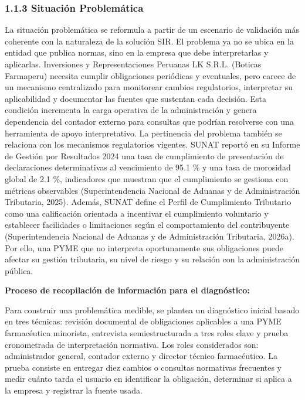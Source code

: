 \documentclass[12pt,a4paper,oneside]{report}
\begin{document}
\subsubsection{1.1.3 Situación
Problemática}\label{situaciuxf3n-problemuxe1tica}

La situación problemática se reformula a partir de un escenario de
validación más coherente con la naturaleza de la solución SIR. El
problema ya no se ubica en la entidad que publica normas, sino en la
empresa que debe interpretarlas y aplicarlas. Inversiones y
Representaciones Peruanas LK S.R.L. (Boticas Farmaperu) necesita cumplir
obligaciones periódicas y eventuales, pero carece de un mecanismo
centralizado para monitorear cambios regulatorios, interpretar su
aplicabilidad y documentar las fuentes que sustentan cada decisión. Esta
condición incrementa la carga operativa de la administración y genera
dependencia del contador externo para consultas que podrían resolverse
con una herramienta de apoyo interpretativo. La pertinencia del problema
también se relaciona con los mecanismos regulatorios vigentes. SUNAT
reportó en su Informe de Gestión por Resultados 2024 una tasa de
cumplimiento de presentación de declaraciones determinativas al
vencimiento de 95.1 \% y una tasa de morosidad global de 2.1 \%,
indicadores que muestran que el cumplimiento se gestiona con métricas
observables (Superintendencia Nacional de Aduanas y de Administración
Tributaria, 2025). Además, SUNAT define el Perfil de Cumplimiento
Tributario como una calificación orientada a incentivar el cumplimiento
voluntario y establecer facilidades o limitaciones según el
comportamiento del contribuyente (Superintendencia Nacional de Aduanas y
de Administración Tributaria, 2026a). Por ello, una PYME que no
interpreta oportunamente sus obligaciones puede afectar su gestión
tributaria, su nivel de riesgo y su relación con la administración
pública.

\textbf{Proceso de recopilación de información para el diagnóstico:}

Para construir una problemática medible, se plantea un diagnóstico
inicial basado en tres técnicas: revisión documental de obligaciones
aplicables a una PYME farmacéutica minorista, entrevista
semiestructurada a tres roles clave y prueba cronometrada de
interpretación normativa. Los roles considerados son: administrador
general, contador externo y director técnico farmacéutico. La prueba
consiste en entregar diez cambios o consultas normativas frecuentes y
medir cuánto tarda el usuario en identificar la obligación, determinar
si aplica a la empresa y registrar la fuente usada.
\end{document}
